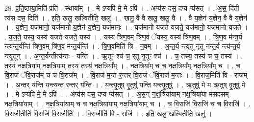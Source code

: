 \documentclass[17pt]{extarticle}
\begin{document}
28. प्र॒ति॒ष्ठाया॒मिति॑ प्रति - स्थाया᳚म् । . मे ऽप्यपि॑ मे॒ मे ऽपि॑ । . अप्य॑स दस॒ दप्य प्य॑सत् । . अ॒स॒ दिती त्य॑स दस॒ दिति॑ । . इति॒ खलु॒ खल्वितीति॒ खलु॑ । . खलु॒ वै वै खलु॒ खलु॒ वै । . वै य॒ज्ञेन॑ य॒ज्ञेन॒ वै वै य॒ज्ञेन॑ । . य॒ज्ञेन॒ यज॑मानो॒ यज॑मानो य॒ज्ञेन॑ य॒ज्ञेन॒ यज॑मानः । . यज॑मानो यजते यजते॒ यज॑मानो॒ यज॑मानो यजते । . य॒ज॒ते॒ यस्य॒ यस्य॑ यजते यजते॒ यस्य॑ । . यस्य॑ त्रिण॒वम् त्रि॑ण॒वं ॅयस्य॒ यस्य॑ त्रिण॒वम् । . त्रि॒ण॒व म॑न्त॒र्य न्त्य॑न्त॒र्यन्ति॑ त्रिण॒वम् त्रि॑ण॒व म॑न्त॒र्यन्ति॑ । . त्रि॒ण॒वमिति॑ त्रि - न॒वम् । . अ॒न्त॒र्य न्त्यृ॒तू नृ॒तू न॑न्त॒र्य न्त्य॑न्त॒र्य न्त्यृ॒तून् । . अ॒न्त॒र्यन्तीत्य॑न्तः - यन्ति॑ । . ऋ॒तूꣳ श्च॑ च॒ र्‌तू नृ॒तूꣳ श्च॑ । . च॒ तस्य॒ तस्य॑ च च॒ तस्य॑ । . तस्य॑ नक्ष॒त्रिया᳚म् नक्ष॒त्रिया॒म् तस्य॒ तस्य॑ नक्ष॒त्रिया᳚म् । . न॒क्ष॒त्रिया᳚म् च च नक्ष॒त्रिया᳚म् नक्ष॒त्रिया᳚म् च । . च॒ वि॒राजं॑ ॅवि॒राज॑म् च च वि॒राज᳚म् । . वि॒राज॑ म॒न्त र॒न्तर् वि॒राजं॑ ॅवि॒राज॑ म॒न्तः । . वि॒राज॒मिति॑ वि - राज᳚म् । . अ॒न्तर् य॑न्ति यन्त्य॒न्त र॒न्तर् य॑न्ति । . य॒न्त्यृ॒तुष् वृ॒तुषु॑ यन्ति यन्त्यृ॒तुषु॑ । . ऋ॒तुषु॑ मे म ऋ॒तुष् वृ॒तुषु॑ मे । . मे ऽप्यपि॑ मे॒ मे ऽपि॑ । . अप्य॑स दस॒ दप्य प्य॑सत् । . अ॒स॒न् न॒क्ष॒त्रिया॑याम् नक्ष॒त्रिया॑या मसदसम् नक्ष॒त्रिया॑याम् । . न॒क्ष॒त्रिया॑याम् च च नक्ष॒त्रिया॑याम् नक्ष॒त्रिया॑याम् च । . च॒ वि॒राजि॑ वि॒राजि॑ च च वि॒राजि॑ । . वि॒राजीतीति॑ वि॒राजि॑ वि॒राजीति॑ । . वि॒राजीति॑ वि - राजि॑ । . इति॒ खलु॒ खल्वितीति॒ खलु॑ । \newline
\end{document}
